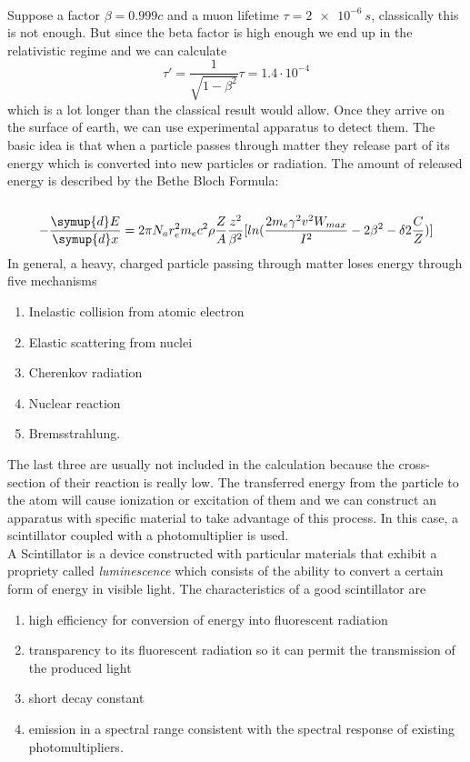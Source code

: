 \\
Suppose a factor $\beta = 0.999c$ and a muon lifetime $\tau = \SI{2e-6}{s}$, classically this is not enough.
But since the beta factor is high enough we end up in the relativistic regime and we can calculate
\begin{equation*}
\tau '  = \frac {1}{\sqrt{1- \beta ^2}} \tau = 1.4 \cdot 10^{-4}
\end{equation*}
which is a lot longer than the classical result would allow. 
Once they arrive on the surface of earth, we can use experimental apparatus to detect them.
The basic idea is that when a particle passes through matter they release part of its energy which is converted into new particles or radiation.
The amount of released energy is described by the
Bethe Bloch Formula:\\\\
\begin{equation*}
-\frac {\symup{d}E}{\symup{d}x} = 2 \pi N_a r_{e}^{2}m_{e}c^{2}\rho \frac{Z}{A} \frac {z^{2}}{\beta^{2}} [ ln(\frac{2m_{e} \gamma^{2} v^{2} W_{max}}{I^{2}}  - 2 \beta^{2} - \delta 2 \frac {C}{Z})]
\end{equation*}
In general, a heavy, charged particle passing through matter loses energy through five mechanisms
\begin{enumerate}
    \item Inelastic collision from atomic electron
    \item Elastic scattering from nuclei
    \item Cherenkov radiation
    \item Nuclear reaction
    \item Bremsstrahlung.
\end{enumerate}
The last three are usually not included in the calculation because the 
cross-section of their reaction is really low. The transferred energy from the particle 
to the atom will cause ionization or excitation of them and we can construct an apparatus
with specific material to take advantage of this process. In this case, a scintillator
coupled with a photomultiplier is used.\\
A Scintillator is a device constructed with particular materials that exhibit a propriety 
called \textit{luminescence} which consists of the ability to convert a certain form of energy
in visible light. The characteristics of a good scintillator are
\begin{enumerate}
   \item high efficiency for conversion of energy into fluorescent radiation
    \item transparency to its fluorescent radiation so it can permit the transmission of the produced light
    \item short decay constant
    \item emission in a spectral range consistent with the spectral response of existing photomultipliers. 
\end{enumerate}
